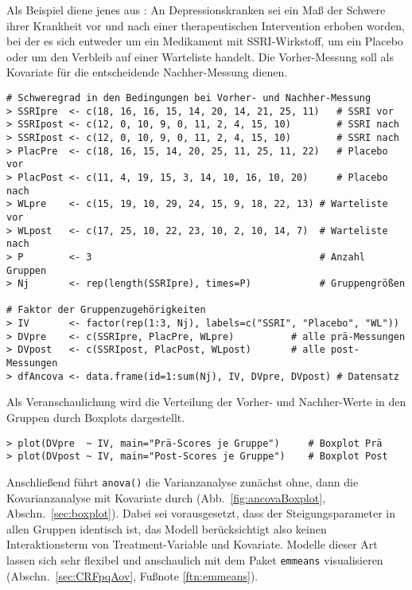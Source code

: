 Als Beispiel diene jenes aus : An Depressionskranken sei ein Maß der Schwere ihrer Krankheit vor und nach einer therapeutischen Intervention erhoben worden, bei der es sich entweder um ein Medikament mit SSRI-Wirkstoff, um ein Placebo oder um den Verbleib auf einer Warteliste handelt. Die Vorher-Messung soll als Kovariate für die entscheidende Nachher-Messung dienen.
\begin{lstlisting}
# Schweregrad in den Bedingungen bei Vorher- und Nachher-Messung
> SSRIpre  <- c(18, 16, 16, 15, 14, 20, 14, 21, 25, 11)   # SSRI vor
> SSRIpost <- c(12, 0, 10, 9, 0, 11, 2, 4, 15, 10)        # SSRI nach
> SSRIpost <- c(12, 0, 10, 9, 0, 11, 2, 4, 15, 10)        # SSRI nach
> PlacPre  <- c(18, 16, 15, 14, 20, 25, 11, 25, 11, 22)   # Placebo vor
> PlacPost <- c(11, 4, 19, 15, 3, 14, 10, 16, 10, 20)     # Placebo nach
> WLpre    <- c(15, 19, 10, 29, 24, 15, 9, 18, 22, 13) # Warteliste vor
> WLpost   <- c(17, 25, 10, 22, 23, 10, 2, 10, 14, 7)  # Warteliste nach
> P        <- 3                                        # Anzahl Gruppen
> Nj       <- rep(length(SSRIpre), times=P)            # Gruppengrößen

# Faktor der Gruppenzugehörigkeiten
> IV       <- factor(rep(1:3, Nj), labels=c("SSRI", "Placebo", "WL"))
> DVpre    <- c(SSRIpre, PlacPre, WLpre)          # alle prä-Messungen
> DVpost   <- c(SSRIpost, PlacPost, WLpost)       # alle post-Messungen
> dfAncova <- data.frame(id=1:sum(Nj), IV, DVpre, DVpost) # Datensatz
\end{lstlisting}

Als Veranschaulichung wird die Verteilung der Vorher- und Nachher-Werte in den Gruppen durch Boxplots dargestellt.
\begin{lstlisting}
> plot(DVpre  ~ IV, main="Prä-Scores je Gruppe")     # Boxplot Prä
> plot(DVpost ~ IV, main="Post-Scores je Gruppe")    # Boxplot Post
\end{lstlisting}

Anschließend führt \lstinline!anova()! die Varianzanalyse zunächst ohne, dann die Kovarianzanalyse mit Kovariate durch (Abb.\ \ref{fig:ancovaBoxplot}, Abschn.\ \ref{sec:boxplot}). Dabei sei vorausgesetzt, dass der Steigungsparameter in allen Gruppen identisch ist, das Modell berücksichtigt also keinen Interaktionsterm von Treatment-Variable und Kovariate. Modelle dieser Art lassen sich sehr flexibel und anschaulich mit dem Paket \lstinline!emmeans! visualisieren (Abschn.\ \ref{sec:CRFpqAov}, Fußnote \ref{ftn:emmeans}).

